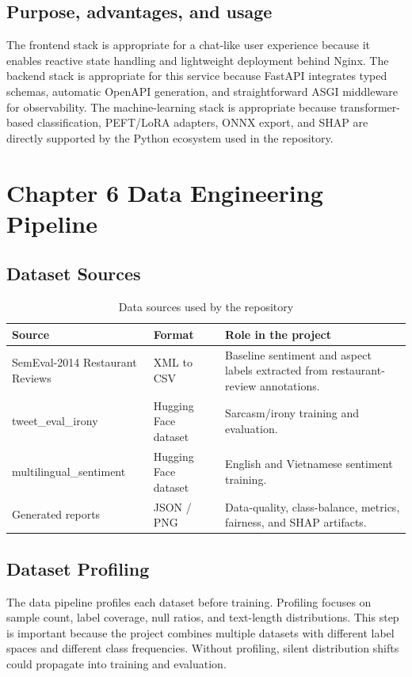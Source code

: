 \documentclass[12pt, a4paper]{article}
\begin{document}
\subsection{Purpose, advantages, and usage}
The frontend stack is appropriate for a chat-like user experience because it enables reactive state handling and lightweight deployment behind Nginx. The backend stack is appropriate for this service because FastAPI integrates typed schemas, automatic OpenAPI generation, and straightforward ASGI middleware for observability. The machine-learning stack is appropriate because transformer-based classification, PEFT/LoRA adapters, ONNX export, and SHAP are directly supported by the Python ecosystem used in the repository.

\section{Chapter 6 Data Engineering Pipeline}

\subsection{Dataset Sources}
\begin{table}[H]
\centering
\caption{Data sources used by the repository}
\begin{tabularx}{\textwidth}{@{} p{3.4cm} p{3cm} X @{}}
\toprule
\textbf{Source} & \textbf{Format} & \textbf{Role in the project} \\
\midrule
SemEval-2014 Restaurant Reviews & XML to CSV & Baseline sentiment and aspect labels extracted from restaurant-review annotations. \\
tweet\_eval\_irony & Hugging Face dataset & Sarcasm/irony training and evaluation. \\
multilingual\_sentiment & Hugging Face dataset & English and Vietnamese sentiment training. \\
Generated reports & JSON / PNG & Data-quality, class-balance, metrics, fairness, and SHAP artifacts. \\
\bottomrule
\end{tabularx}
\end{table}

\subsection{Dataset Profiling}
The data pipeline profiles each dataset before training. Profiling focuses on sample count, label coverage, null ratios, and text-length distributions. This step is important because the project combines multiple datasets with different label spaces and different class frequencies. Without profiling, silent distribution shifts could propagate into training and evaluation.
\end{document}
